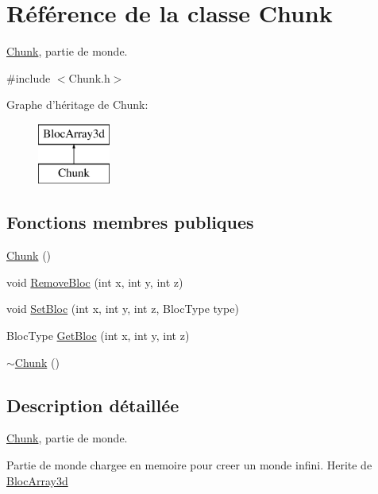 \hypertarget{class_chunk}{\section{Référence de la classe Chunk}
\label{class_chunk}
}


\hyperlink{class_chunk}{Chunk}, partie de monde.  




{\ttfamily \#include $<$Chunk.\-h$>$}

Graphe d'héritage de Chunk\-:\begin{figure}[H]
\begin{center}
\leavevmode
\includegraphics[height=2.000000cm]{class_chunk}
\end{center}
\end{figure}
\subsection*{Fonctions membres publiques}
\begin{DoxyCompactItemize}
\item 
\hyperlink{class_chunk_acc32e1562cad6664c98ee07edecdbdf9}{Chunk} ()
\item 
void \hyperlink{class_chunk_a07695d2f852efdda11d3150e674b4455}{Remove\-Bloc} (int x, int y, int z)
\item 
void \hyperlink{class_chunk_a82df93930a6014da19eb998e01013935}{Set\-Bloc} (int x, int y, int z, Bloc\-Type type)
\item 
Bloc\-Type \hyperlink{class_chunk_a24561023834375cccd736e01c0de0396}{Get\-Bloc} (int x, int y, int z)
\item 
\hyperlink{class_chunk_ad21b515f41c9a1d21740b9e7e3f8eede}{$\sim$\-Chunk} ()
\end{DoxyCompactItemize}


\subsection{Description détaillée}
\hyperlink{class_chunk}{Chunk}, partie de monde. 

Partie de monde chargee en memoire pour creer un monde infini. Herite de \hyperlink{class_bloc_array3d}{Bloc\-Array3d} 

